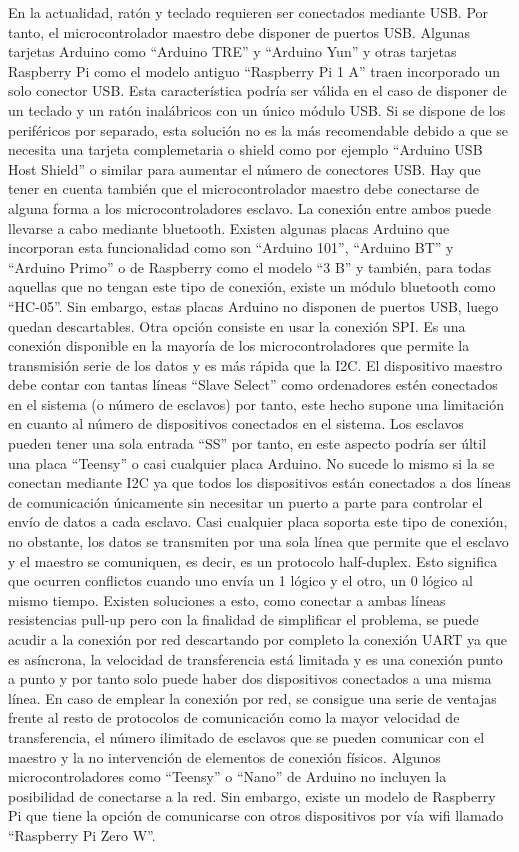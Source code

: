 En la actualidad, ratón y teclado requieren ser conectados mediante USB. Por tanto, el microcontrolador maestro debe disponer de puertos USB. Algunas tarjetas Arduino como “Arduino TRE” y “Arduino Yun” y otras tarjetas Raspberry Pi como el modelo antiguo “Raspberry Pi 1 A” traen incorporado un solo conector USB. Esta característica podría ser válida en el caso de disponer de un teclado y un ratón inalábricos con un único módulo USB. Si se dispone de los periféricos por separado, esta solución no es la más recomendable debido a que se necesita una tarjeta complemetaria o shield como por ejemplo “Arduino USB Host Shield” o similar para aumentar el número de conectores USB. Hay que tener en cuenta también que el microcontrolador maestro debe conectarse de alguna forma a los microcontroladores esclavo. La conexión entre ambos puede llevarse a cabo mediante bluetooth. Existen algunas placas Arduino que incorporan esta funcionalidad como son “Arduino 101”, “Arduino BT” y “Arduino Primo” o de Raspberry como el modelo “3 B” y también, para todas aquellas que no tengan este tipo de conexión, existe un módulo bluetooth como “HC-05”. Sin embargo, estas placas Arduino no disponen de puertos USB, luego quedan descartables. Otra opción consiste en usar la conexión SPI. Es una conexión disponible en la mayoría de los microcontroladores que permite la transmisión serie de los datos y es más rápida que la I2C. El dispositivo maestro debe contar con tantas líneas “Slave Select” como ordenadores estén conectados en el sistema (o número de esclavos) por tanto, este hecho supone una limitación en cuanto al número de dispositivos conectados en el sistema. Los esclavos pueden tener una sola entrada “SS” por tanto, en este aspecto podría ser últil una placa “Teensy” o casi cualquier placa Arduino. No sucede lo mismo si la se conectan mediante I2C ya que todos los dispositivos están conectados a dos líneas de comunicación únicamente sin necesitar un puerto a parte para controlar el envío de datos a cada esclavo. Casi cualquier placa soporta este tipo de conexión, no obstante, los datos se transmiten por una sola línea que permite que el esclavo y el maestro se comuniquen, es decir, es un protocolo half-duplex. Esto significa que ocurren conflictos cuando uno envía un 1 lógico y el otro, un 0 lógico al mismo tiempo. Existen soluciones a esto, como conectar a ambas líneas resistencias pull-up pero con la finalidad de simplificar el problema, se puede acudir a la conexión por red descartando por completo la conexión UART ya que es asíncrona, la velocidad de transferencia está limitada y es una conexión punto a punto y por tanto solo puede haber dos dispositivos conectados a una misma línea. En caso de emplear la conexión por red, se consigue una serie de ventajas frente al resto de protocolos de comunicación como la mayor velocidad de transferencia, el número ilimitado de esclavos que se pueden comunicar con el maestro y la no intervención de elementos de conexión físicos. Algunos microcontroladores como “Teensy” o “Nano” de Arduino no incluyen la posibilidad de conectarse a la red. Sin embargo, existe un modelo de Raspberry Pi que tiene la opción de comunicarse con otros dispositivos por vía wifi llamado “Raspberry Pi Zero W”.

